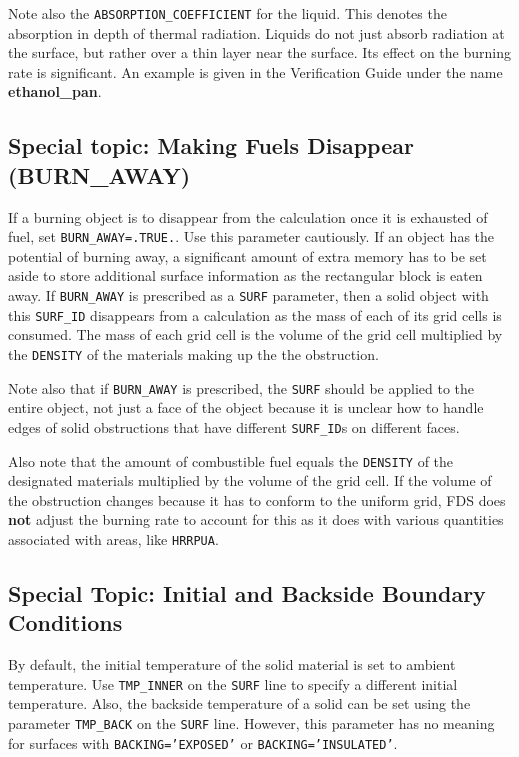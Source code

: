 \documentclass[11pt]{book}
\newcommand{\ct}{\tt\small}
\begin{document}
Note also the {\ct ABSORPTION\_COEFFICIENT} for the liquid. This
denotes the absorption in depth of thermal radiation. Liquids do not
just absorb radiation at the surface, but rather over a thin layer
near the surface. Its effect on the burning rate is significant. An
example is given in the Verification Guide under the name {\bf
ethanol\_pan}.


\subsection{Special topic: Making Fuels Disappear (BURN\_AWAY)}


If a burning object is to disappear from the
calculation once it is exhausted of fuel, set {\ct BURN\_AWAY=.TRUE.}.
Use this parameter cautiously. If an object has the potential of
burning away, a significant amount of extra memory has to be set aside
to store additional surface information as the rectangular block is
eaten away. If {\ct BURN\_AWAY} is prescribed as a {\ct SURF} parameter, then a solid
object with this {\ct SURF\_ID} disappears from a calculation as
the mass of each of its grid cells is consumed. The mass of each grid
cell is the volume of the grid cell multiplied by the {\ct DENSITY} of the
materials making up the the obstruction.

\begin{warning}
\noindent
Note also that if {\ct BURN\_AWAY} is prescribed, the {\ct SURF} should be applied to the
entire object, not just a face of the object because it is unclear how to handle edges
of solid obstructions that have different {\ct SURF\_ID}s on different faces.
\end{warning}

\noindent
Also note that the amount of combustible fuel equals the {\ct DENSITY} of the designated materials
multiplied by the volume of the grid cell. If the volume of the obstruction changes because it has
to conform to the uniform grid, FDS does {\bf not} adjust the burning rate to account for this as
it does with various quantities associated with areas, like {\ct HRRPUA}.

\subsection{Special Topic: Initial and Backside Boundary Conditions}

By default, the initial temperature of the solid material is set to
ambient temperature. Use {\ct TMP\_INNER} on the {\ct SURF} line to
specify a different initial temperature.
Also, the backside temperature of a solid can be set using the parameter {\ct TMP\_BACK} on the {\ct SURF} line. However, this parameter has no
meaning for surfaces with {\ct BACKING='EXPOSED'} or {\ct BACKING='INSULATED'}.
\end{document}
